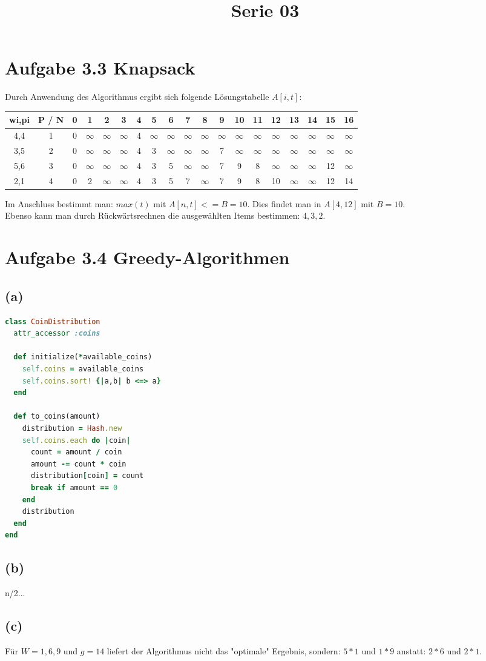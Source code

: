  
\title{Serie 03}

 
\section*{Aufgabe 3.3 Knapsack}

Durch Anwendung des Algorithmus ergibt sich folgende Lösungstabelle $A[i,t]$:\\

\begin{tabular}{ccccccccccccccccccc}
\hline
wi,pi & P / N & 0 & 1 & 2 & 3 & 4 & 5 & 6 & 7 & 8 & 9 & 10 & 11 & 12 & 13 & 14 & 15 & 16\\
\hline
4,4 & 1 & 0 & $\infty$ & $\infty$ & $\infty$ & 4 & $\infty$ & $\infty$ & $\infty$ & $\infty$ & $\infty$ & $\infty$ & $\infty$ & $\infty$ & $\infty$ & $\infty$ & $\infty$ & $\infty$\\
\hline
3,5 & 2 & 0 & $\infty$ & $\infty$ & $\infty$ & 4 & 3 & $\infty$ & $\infty$ & $\infty$ & 7 & $\infty$ & $\infty$ & $\infty$ & $\infty$ & $\infty$ & $\infty$ & $\infty$\\
\hline
5,6 & 3 & 0 & $\infty$ & $\infty$ & $\infty$ & 4 & 3 & 5 & $\infty$ & $\infty$ & 7 & 9 & 8 & $\infty$ & $\infty$ & $\infty$ & 12 & $\infty$\\
\hline
2,1 & 4 & 0 & 2 & $\infty$ & $\infty$ & 4 & 3 & 5 & 7 & $\infty$ & 7 & 9 & 8 & 10 & $\infty$ & $\infty$ & 12 & 14\\
\hline
\end{tabular}

Im Anschluss bestimmt man: $max(t)$ mit $A[n, t] <= B = 10$.
Dies findet man in $A[4,12]$ mit $B = 10$. \\
Ebenso kann man durch Rückwärtsrechnen die ausgewählten Items bestimmen: ${4,3,2}$.

\section*{Aufgabe 3.4 Greedy-Algorithmen}

\subsection*{(a)}

\begin{lstlisting}[language=Ruby,numbers=right]
class CoinDistribution
  attr_accessor :coins
  
  def initialize(*available_coins)
    self.coins = available_coins
    self.coins.sort! {|a,b| b <=> a}
  end
  
  def to_coins(amount)
    distribution = Hash.new
    self.coins.each do |coin|
      count = amount / coin
      amount -= count * coin
      distribution[coin] = count
      break if amount == 0
    end
    distribution
  end
end  
\end{lstlisting}

\subsection*{(b)}

n/2...

\subsection*{(c)}

Für $W = {1,6,9}$ und $g = 14$ liefert der Algorithmus nicht das "optimale" Ergebnis, sondern: $5 * 1$ und $1 * 9$ anstatt: $2 * 6$ und $2 * 1$.


